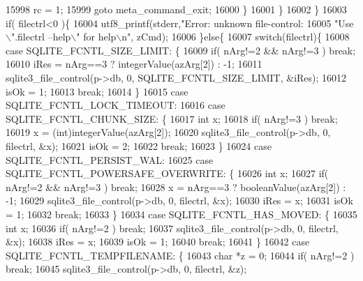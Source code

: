 \begin{DoxyCode}
{{{{{{{{{{{{{{{{15998           rc = 1;
15999           \textcolor{keywordflow}{goto} meta\_command\_exit;
16000         \}
16001       \}
16002     \}
16003     \textcolor{keywordflow}{if}( filectrl<0 )\{
16004       utf8_printf(stderr,\textcolor{stringliteral}{"Error: unknown file-control: %
16005                          \textcolor{stringliteral}{"Use \(\backslash\)".filectrl --help\(\backslash\)" for help\(\backslash\)n"}, zCmd);
16006     \}\textcolor{keywordflow}{else}\{
16007       \textcolor{keywordflow}{switch}(filectrl)\{
16008         \textcolor{keywordflow}{case} SQLITE_FCNTL_SIZE_LIMIT: \{
16009           \textcolor{keywordflow}{if}( nArg!=2 && nArg!=3 ) \textcolor{keywordflow}{break};
16010           iRes = nArg==3 ? integerValue(azArg[2]) : -1;
16011           sqlite3_file_control(p->db, 0, SQLITE_FCNTL_SIZE_LIMIT, &iRes);
16012           isOk = 1;
16013           \textcolor{keywordflow}{break};
16014         \}
16015         \textcolor{keywordflow}{case} SQLITE_FCNTL_LOCK_TIMEOUT:
16016         \textcolor{keywordflow}{case} SQLITE_FCNTL_CHUNK_SIZE: \{
16017           \textcolor{keywordtype}{int} x;
16018           \textcolor{keywordflow}{if}( nArg!=3 ) \textcolor{keywordflow}{break};
16019           x = (int)integerValue(azArg[2]);
16020           sqlite3_file_control(p->db, 0, filectrl, &x);
16021           isOk = 2;
16022           \textcolor{keywordflow}{break};
16023         \}
16024         \textcolor{keywordflow}{case} SQLITE_FCNTL_PERSIST_WAL:
16025         \textcolor{keywordflow}{case} SQLITE_FCNTL_POWERSAFE_OVERWRITE: \{
16026           \textcolor{keywordtype}{int} x;
16027           \textcolor{keywordflow}{if}( nArg!=2 && nArg!=3 ) \textcolor{keywordflow}{break};
16028           x = nArg==3 ? booleanValue(azArg[2]) : -1;
16029           sqlite3_file_control(p->db, 0, filectrl, &x);
16030           iRes = x;
16031           isOk = 1;
16032           \textcolor{keywordflow}{break};
16033         \}
16034         \textcolor{keywordflow}{case} SQLITE_FCNTL_HAS_MOVED: \{
16035           \textcolor{keywordtype}{int} x;
16036           \textcolor{keywordflow}{if}( nArg!=2 ) \textcolor{keywordflow}{break};
16037           sqlite3_file_control(p->db, 0, filectrl, &x);
16038           iRes = x;
16039           isOk = 1;
16040           \textcolor{keywordflow}{break};
16041         \}
16042         \textcolor{keywordflow}{case} SQLITE_FCNTL_TEMPFILENAME: \{
16043           \textcolor{keywordtype}{char} *z = 0;
16044           \textcolor{keywordflow}{if}( nArg!=2 ) \textcolor{keywordflow}{break};
16045           sqlite3_file_control(p->db, 0, filectrl, &z);
}}}}}}}}}}}}}}}}}
\end{DoxyCode}
